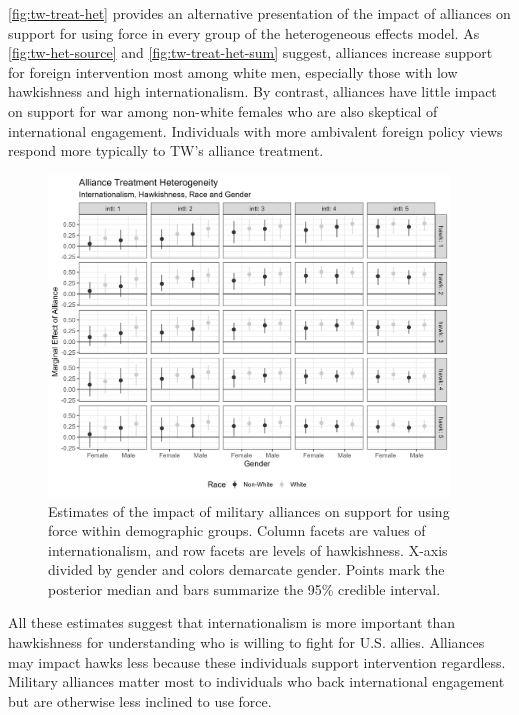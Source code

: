 \documentclass[12pt]{article}
\begin{document}
\autoref{fig:tw-treat-het} provides an alternative presentation of the impact of alliances on support for using force in every group of the heterogeneous effects model. 
As \autoref{fig:tw-het-source} and \autoref{fig:tw-treat-het-sum} suggest, alliances increase support for foreign intervention most among white men, especially those with low hawkishness and high internationalism.
By contrast, alliances have little impact on support for war among non-white females who are also skeptical of international engagement.
Individuals with more ambivalent foreign policy views respond more typically to TW's alliance treatment. 


\begin{figure}[htpb]
	\centering
		\includegraphics[width=0.95\textwidth]{../figures/tw-treat-het.png}
	\caption{Estimates of the impact of military alliances on support for using force within demographic groups. Column facets are values of internationalism, and row facets are levels of hawkishness. X-axis divided by gender and colors demarcate gender. Points mark the posterior median and bars summarize the 95\% credible interval.}
	\label{fig:tw-treat-het}
\end{figure}


All these estimates suggest that internationalism is more important than hawkishness for understanding who is willing to fight for U.S. allies. 
Alliances may impact hawks less because these individuals support intervention regardless. 
Military alliances matter most to individuals who back international engagement but are otherwise less inclined to use force. 
\end{document}

